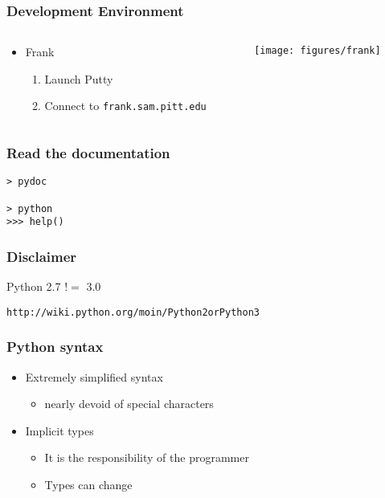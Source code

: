 \documentclass[xcolor=table,10pt,final]{beamer}
\begin{document}
\begin{frame}[fragile]
  \frametitle{Development Environment}
  \begin{columns}
    \begin{column}{0.5\paperwidth}
      \begin{itemize}
        \item Frank
          \begin{enumerate}
            \item Launch Putty
            \item Connect to {\tt frank.sam.pitt.edu}
          \end{enumerate}
      \end{itemize}
    \end{column}
    \begin{column}{0.5\paperwidth}
      \centering
      \texttt{[image: figures/frank]}
    \end{column}
  \end{columns}
\end{frame}

\begin{frame}[fragile]
  \frametitle{Read the documentation}
  \begin{verbatim}
> pydoc

> python
>>> help()
\end{verbatim}
\end{frame}




\begin{frame}[fragile]
  \frametitle{Disclaimer}
  Python 2.7 $!=$ 3.0
  \vskip1cm
  \begin{verbatim}
http://wiki.python.org/moin/Python2orPython3
\end{verbatim}
\end{frame}

\begin{frame}
  \frametitle{Python syntax}
  \begin{itemize}
    \item Extremely simplified syntax
      \begin{itemize}
        \item nearly devoid of special characters
      \end{itemize}
    \item Implicit types
      \begin{itemize}
        \item It is the responsibility of the programmer
        \item Types can change
      \end{itemize}
  \end{itemize}
\end{frame}
\end{document}
